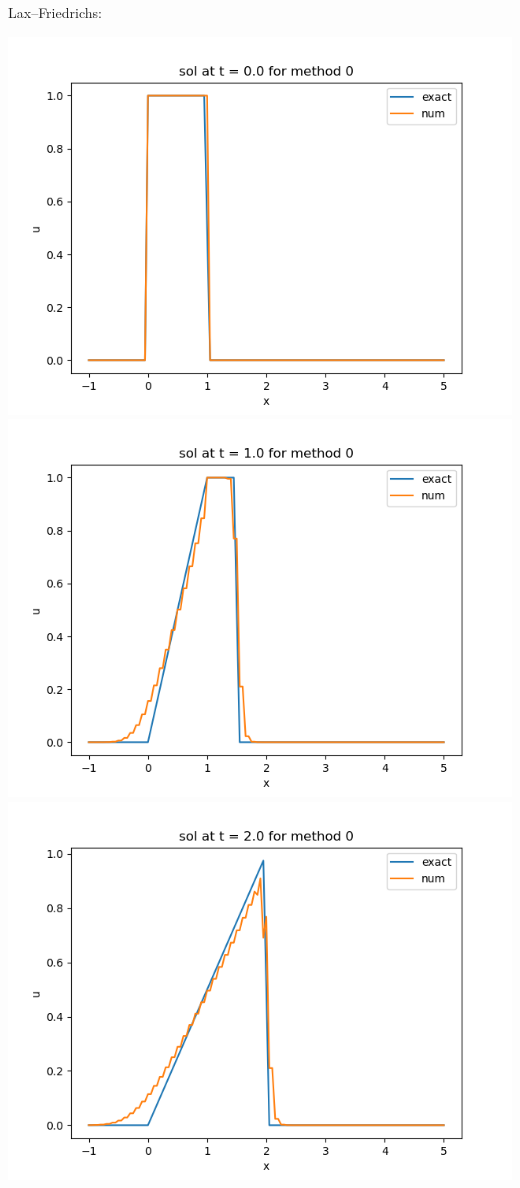 \documentclass{article}
\begin{document}
\begin{enumerate}
Lax--Friedrichs:
\begin{center}
	\includegraphics[scale=.23]{hw13 sol t = 0 method 0}
	\includegraphics[scale=.23]{hw13 sol t = 1 method 0}
	\includegraphics[scale=.23]{hw13 sol t = 2 method 0}

\end{center}
\end{enumerate}
\end{document}
